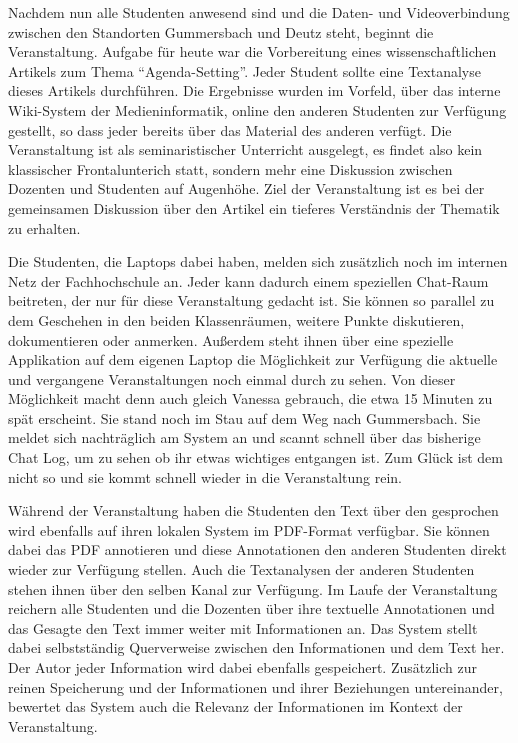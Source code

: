   Nachdem nun alle Studenten anwesend sind und die Daten- und Videoverbindung zwischen den Standorten Gummersbach und Deutz steht, beginnt die Veranstaltung. Aufgabe für heute war die Vorbereitung eines wissenschaftlichen Artikels zum Thema "`Agenda-Setting"'. Jeder Student sollte eine Textanalyse dieses Artikels durchführen. Die Ergebnisse wurden im Vorfeld, über das interne Wiki-System der Medieninformatik, online den anderen Studenten zur Verfügung gestellt, so dass jeder bereits über das Material des anderen verfügt. Die Veranstaltung ist als seminaristischer Unterricht ausgelegt, es findet also kein klassischer Frontalunterich statt, sondern mehr eine Diskussion zwischen Dozenten und Studenten auf Augenhöhe. Ziel der Veranstaltung ist es bei der gemeinsamen Diskussion über den Artikel ein tieferes Verständnis der Thematik zu erhalten.

  Die Studenten, die Laptops dabei haben, melden sich zusätzlich noch im internen Netz der Fachhochschule an. Jeder kann dadurch einem speziellen Chat-Raum beitreten, der nur für diese Veranstaltung gedacht ist. Sie können so parallel zu dem Geschehen in den beiden Klassenräumen, weitere Punkte diskutieren, dokumentieren oder anmerken. Außerdem steht ihnen über eine spezielle Applikation auf dem eigenen Laptop die Möglichkeit zur Verfügung die aktuelle und vergangene Veranstaltungen noch einmal durch zu sehen. Von dieser Möglichkeit macht denn auch gleich Vanessa gebrauch, die etwa 15 Minuten zu spät erscheint. Sie stand noch im Stau auf dem Weg nach Gummersbach. Sie meldet sich nachträglich am System an und scannt schnell über das bisherige Chat Log, um zu sehen ob ihr etwas wichtiges entgangen ist. Zum Glück ist dem nicht so und sie kommt schnell wieder in die Veranstaltung rein.

  Während der Veranstaltung haben die Studenten den Text über den gesprochen wird ebenfalls auf ihren lokalen System im PDF-Format verfügbar. Sie können dabei das PDF annotieren und diese Annotationen den anderen Studenten direkt wieder zur Verfügung stellen. Auch die Textanalysen der anderen Studenten stehen ihnen über den selben Kanal zur Verfügung. Im Laufe der Veranstaltung reichern alle Studenten und die Dozenten über ihre textuelle Annotationen und das Gesagte den Text immer weiter mit Informationen an. Das System stellt dabei selbstständig Querverweise zwischen den Informationen und dem Text her. Der Autor jeder Information wird dabei ebenfalls gespeichert. Zusätzlich zur reinen Speicherung und der Informationen und ihrer Beziehungen untereinander, bewertet das System auch die Relevanz der Informationen im Kontext der Veranstaltung.

